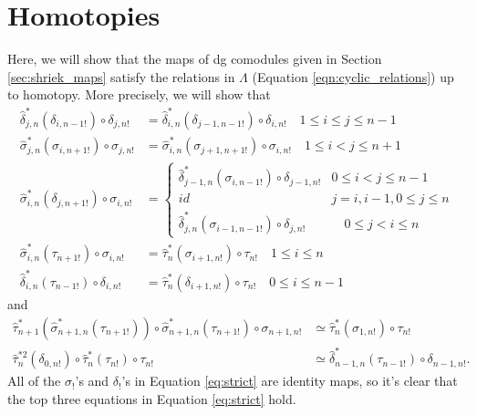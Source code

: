 \section{Homotopies}
Here, we will show that the maps 
of dg comodules given in Section 
\ref{sec:shriek_maps} satisfy the 
relations in $\Lambda$ (Equation 
\ref{eqn:cyclic_relations}) up to 
homotopy. More precisely, we will 
show that
\begin{equation}
\label{eq:strict}
\begin{split}
\hat{\delta}_{j,n}^*(\delta_{i,n-1!}) \circ \delta_{j,n!} 
&= 
\hat{\delta}_{i,n}^*(\delta_{j-1,n-1!}) \circ \delta_{i,n!} 
  \quad 1 \leq i \leq j \leq n-1 \\
\hat{\sigma}_{j,n}^*(\sigma_{i,n+1!}) \circ \sigma_{j,n!} 
&= 
\hat{\sigma}_{i,n}^*(\sigma_{j+1,n+1!}) \circ \sigma_{i,n!}
  \quad 1 \leq i < j \leq n+1 \\
\hat{\sigma}_{i,n}^*(\delta_{j,n+1!}) \circ \sigma_{i,n!} 
&= 
  \begin{cases}
    \hat{\delta}_{j-1,n}^*(\sigma_{i,n-1!}) \circ \delta_{j-1,n!} 
      & 0 \leq i < j \leq n-1\\
    id & j = i, i-1, 0 \leq j \leq n\\
    \hat{\delta}_{j,n}^*(\sigma_{i-1,n-1!}) \circ \delta_{j,n!} 
      & \quad 0 \leq j < i \leq n
   \end{cases}\\
\hat{\sigma}_{i,n}^*(\tau_{n+1!}) \circ \sigma_{i,n!} 
&= 
\hat{\tau}_n^*(\sigma_{i+1,n!}) \circ \tau_{n!}
  \quad 1 \leq i \leq n\\
\hat{\delta}_{i,n}^*(\tau_{n-1!}) \circ \delta_{i,n!} 
&= 
\hat{\tau}_n^*(\delta_{i+1,n!}) \circ \tau_{n!}
  \quad 0 \leq i \leq n-1
\end{split}
\end{equation}
and 
\begin{equation}
\begin{split}  
\hat{\tau}_{n+1}^*(\hat{\sigma}_{n+1,n}^*(\tau_{n+1!})) \circ 
  \hat{\sigma}_{n+1,n}^*(\tau_{n+1!}) \circ
  \sigma_{n+1,n!} 
&\simeq 
\hat{\tau}_n^*(\sigma_{1,n!}) \circ \tau_{n!} \\
\hat{\tau}_n^{*2}(\delta_{0,n!}) \circ 
  \hat{\tau}_n^*(\tau_{n!}) \circ \tau_{n!} 
&\simeq 
\hat{\delta}_{n-1,n}^*(\tau_{n-1!}) \circ \delta_{n-1,n!}. 
\end{split}
\end{equation}
All of the $\sigma_!$'s and $\delta_!$'s in Equation 
\ref{eq:strict} are identity maps, so it's clear that 
the top three equations in Equation \ref{eq:strict} 
hold. 